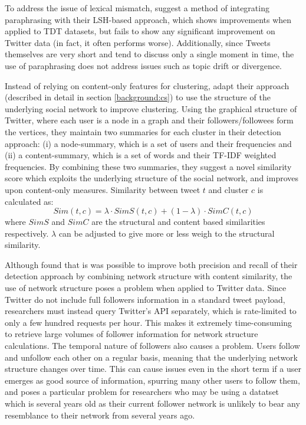 To address the issue of lexical mismatch, \citep{Petrovic:2012:UPI:2382029.2382072} suggest a method of integrating paraphrasing with their LSH-based approach, which shows improvements when applied to TDT datasets, but fails to show any significant improvement on Twitter data (in fact, it often performs worse).
Additionally, since Tweets themselves are very short and tend to discuss only a single moment in time, the use of paraphrasing does not address issues such as topic drift or divergence.

Instead of relying on content-only features for clustering, \cite{Aggarwal12} adapt their approach (described in detail in section \ref{background:cs}) to use the structure of the underlying social network to improve clustering.
Using the graphical structure of Twitter, where each user is a node in a graph and their followers/followees form the vertices, they maintain two summaries
for each cluster in their detection approach: (i) a node-summary, which is a set of users and their frequencies and (ii) a content-summary, which is a set of words and their TF-IDF \citep{Salton:1988:TAA:54259.54260} weighted frequencies.
By combining these two summaries, they suggest a novel similarity score which exploits the underlying structure of the social network, and improves upon content-only measures.
Similarity between tweet $t$ and cluster $c$ is calculated as:
\begin{displaymath}
	Sim(t, c) = \lambda \cdot SimS(t, c) + (1 - \lambda) \cdot SimC(t, c)
\end{displaymath}
where $SimS$ and $SimC$ are the structural and content based similarities respectively.
$\lambda$ can be adjusted to give more or less weigh to the structural similarity.

Although \cite{Aggarwal12} found that is was possible to improve both precision and recall of their detection approach by combining network structure with content similarity, the use of network structure poses a problem when applied to Twitter data.
Since Twitter do not include full followers information in a standard tweet payload, researchers must instead query Twitter's API separately, which is rate-limited to only a few hundred requests per hour.
This makes it extremely time-consuming to retrieve large volumes of follower information for network structure calculations.
The temporal nature of followers also causes a problem.
Users follow and unfollow each other on a regular basis, meaning that the underlying network structure changes over time.
This can cause issues even in the short term if a user emerges as good source of information, spurring many other users to follow them, and poses a particular problem for researchers who may be using a datatset which is several years old as their current follower network is unlikely to bear any resemblance to their network from several years ago.

